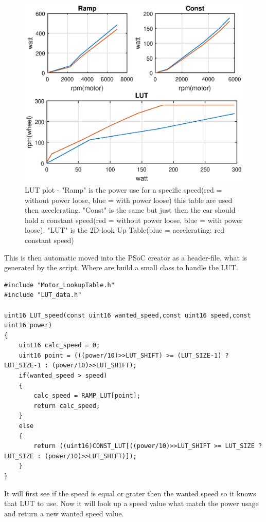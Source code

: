 \begin{figure}[H]
	\centering
	\includegraphics [width=6in]{Software/Pictures/LUT.eps}
	\caption{LUT plot - "Ramp" is the power use for a specific speed(red = without power loose, blue = with power loose) this table are used then accelerating. "Const" is the same but just then the car should hold a constant speed(red = without power loose, blue = with power loose). "LUT" is the 2D-look Up Table(blue = accelerating; red constant speed)}
	\label{fig:LUT_plot}
\end{figure}

This is then automatic moved into the PSoC creator as a header-file, what is generated by the script. Where are build a small class to handle the LUT.

\lstset{language=C}
\begin{lstlisting}
#include "Motor_LookupTable.h"
#include "LUT_data.h"

uint16 LUT_speed(const uint16 wanted_speed,const uint16 speed,const uint16 power)
{
	uint16 calc_speed = 0;
	uint16 point = (((power/10)>>LUT_SHIFT) >= (LUT_SIZE-1) ? LUT_SIZE-1 : (power/10)>>LUT_SHIFT);
	if(wanted_speed > speed)
	{
		calc_speed = RAMP_LUT[point];
		return calc_speed;
	}
	else
	{
		return ((uint16)CONST_LUT[((power/10)>>LUT_SHIFT >= LUT_SIZE ? LUT_SIZE : (power/10)>>LUT_SHIFT)]);
	}
}
\end{lstlisting}

It will first see if the speed is equal or grater then the wanted speed so it knows that LUT to use. Now it will look up a speed value what match the power usage and return a new wanted speed value.



